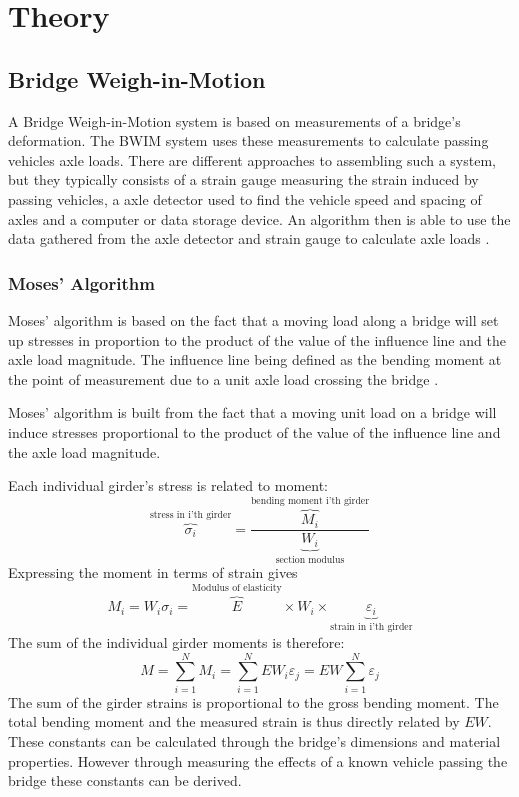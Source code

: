 \section{Theory}

\subsection{Bridge Weigh-in-Motion}
A Bridge Weigh-in-Motion system is based on measurements of a bridge's deformation. The BWIM system uses these measurements to calculate passing vehicles axle loads.
There are different approaches to assembling such a system, but they typically consists of a strain gauge measuring the strain induced by passing vehicles, a axle detector used to find the vehicle speed and spacing of axles and a computer or data storage device. An algorithm then is able to use the data gathered from the axle detector and strain gauge to calculate axle loads \cite{Quilligan}.
\subsubsection{Moses' Algorithm}
Moses' algorithm is based on the fact that a moving load along a bridge will set up stresses in proportion to the product of the value of the influence line and the axle load magnitude. The influence line being defined as the bending moment at the point of measurement due to a unit axle load crossing the bridge \cite{Quilligan}.

Moses' algorithm is built from the fact that a moving unit load on a bridge will induce stresses proportional to the product of the value of the influence line and the axle load magnitude. 

Each individual girder's stress is related to moment:
\begin{equation}
\overbrace{\sigma_{i}}^\text{stress in i'th girder} = \frac{\overbrace{M_i}^\text{bending moment i'th girder}}{\underbrace{W_i}_\text{section modulus}}
\end{equation}
Expressing the moment in terms of strain gives
\begin{equation}
M_i = W_i \sigma_i = \overbrace{E}^\text{Modulus of elasticity} \times W_i \times \underbrace{\varepsilon_i}_\text{strain in i'th girder}
\end{equation}
The sum of the individual girder moments is therefore:
\begin{equation}
M = \sum_{i = 1}^{N} M_i = \sum_{i = 1}^{N} EW_i \varepsilon_j = EW \sum_{i = 1}^{N} \varepsilon_j
\end{equation}
The sum of the girder strains is proportional to the gross bending moment. The total bending moment and the measured strain is thus directly related by $EW$. These constants can be calculated through the bridge's dimensions and material properties. However through measuring the effects of a known vehicle passing the bridge these constants can be derived.

